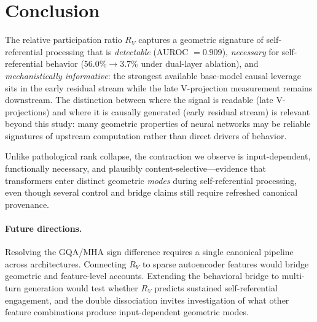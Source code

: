 \documentclass{article}
\newcommand{\RV}{R_V}
\begin{document}
\section{Conclusion}

The relative participation ratio $\RV$ captures a geometric signature of self-referential
processing that is \emph{detectable} (AUROC $= 0.909$),
\emph{necessary} for self-referential behavior ($56.0\% \to 3.7\%$ under dual-layer ablation),
and \emph{mechanistically informative}: the strongest available base-model causal leverage sits in
the early residual stream while the late V-projection measurement remains downstream.
The distinction between where the signal is readable (late V-projections) and where it is
causally generated (early residual stream) is relevant beyond this study: many geometric
properties of neural networks may be reliable signatures of upstream computation rather than
direct drivers of behavior.

Unlike pathological rank collapse, the contraction we observe is input-dependent, functionally
necessary, and plausibly content-selective---evidence that transformers enter distinct geometric
\emph{modes} during self-referential processing, even though several control and bridge claims
still require refreshed canonical provenance.

\paragraph{Future directions.}
Resolving the GQA/MHA sign difference requires a single canonical pipeline across architectures.
Connecting $\RV$ to sparse autoencoder features would bridge geometric and feature-level
accounts.
Extending the behavioral bridge to multi-turn generation would test whether $\RV$ predicts
sustained self-referential engagement, and the double dissociation invites investigation of
what other feature combinations produce input-dependent geometric modes.






\appendix
\end{document}
